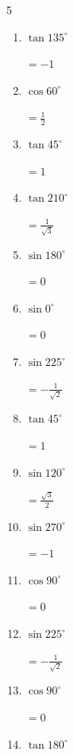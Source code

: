 \begin{multicols}{5}
\begin{enumerate}
  \item $\displaystyle \tan{135^\circ}$

        $\displaystyle =-1$

\columnbreak %

  \item $\displaystyle \cos{60^\circ}$

        $\displaystyle =\frac{1}{2}$

  \item $\displaystyle \tan{45^\circ}$

        $\displaystyle =1$

  \item $\displaystyle \tan{210^\circ}$

        $\displaystyle =\frac{1}{\sqrt{3}}$

  \item $\displaystyle \sin{180^\circ}$

        $\displaystyle =0$

  \item $\displaystyle \sin{0^\circ}$

        $\displaystyle =0$

  \item $\displaystyle \sin{225^\circ}$

        $\displaystyle =-\frac{1}{\sqrt{2}}$

  \item $\displaystyle \tan{45^\circ}$

        $\displaystyle =1$

  \item $\displaystyle \sin{120^\circ}$

        $\displaystyle =\frac{\sqrt{3}}{2}$

  \item $\displaystyle \sin{270^\circ}$

        $\displaystyle =-1$

  \item $\displaystyle \cos{90^\circ}$

        $\displaystyle =0$

  \item $\displaystyle \sin{225^\circ}$

        $\displaystyle =-\frac{1}{\sqrt{2}}$

  \item $\displaystyle \cos{90^\circ}$

        $\displaystyle =0$

  \item $\displaystyle \tan{180^\circ}$


\end{enumerate}
\end{multicols}
